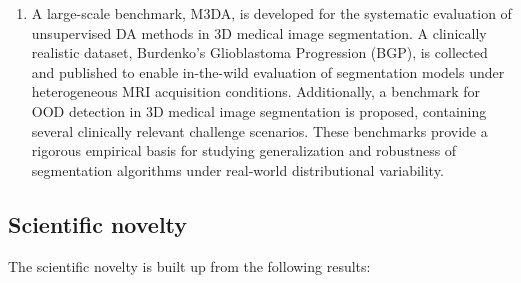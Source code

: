 \begin{enumerate}
    \item A large-scale benchmark, M3DA, is developed for the systematic evaluation of unsupervised DA methods in 3D medical image segmentation. A clinically realistic dataset, Burdenko’s Glioblastoma Progression (BGP), is collected and published to enable in-the-wild evaluation of segmentation models under heterogeneous MRI acquisition conditions. Additionally, a benchmark for OOD detection in 3D medical image segmentation is proposed, containing several clinically relevant challenge scenarios. These benchmarks provide a rigorous empirical basis for studying generalization and robustness of segmentation algorithms under real-world distributional variability.
 
\end{enumerate}


\subsection*{Scientific novelty}

The scientific novelty is built up from the following results:

